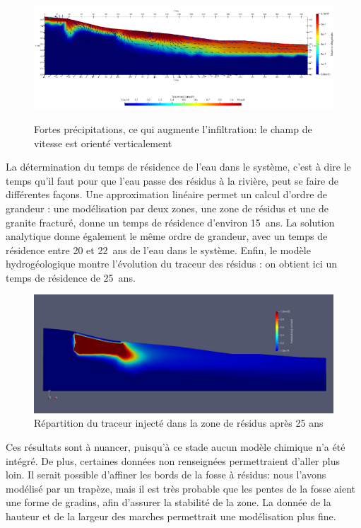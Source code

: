 \documentclass{article}
\begin{document}
\begin{figure}[H]
    \centering
    \includegraphics[width=0.9\linewidth]{III_B_3_7.png}
    \label{fig:v_précipitations_ribiere_2}
    \caption{Fortes précipitations, ce qui augmente l'infiltration: le champ de vitesse est orienté verticalement}
\end{figure}



La détermination du temps de résidence de l'eau dans le système, c'est à dire le temps qu'il faut pour que l'eau passe des résidus à la rivière, peut se faire de différentes façons. Une approximation linéaire permet un calcul d’ordre de grandeur : une modélisation par deux zones, une zone de résidus et une de granite fracturé, donne un temps de résidence d’environ 15~ans. La solution analytique donne également le même ordre de grandeur, avec un temps de résidence entre 20 et 22~ans de l'eau dans le système. Enfin, le modèle hydrogéologique montre l’évolution du traceur des résidus : on obtient ici un temps de résidence de 25~ans.

\begin{figure}[H]
    \centering
    \includegraphics[width=0.9\linewidth]{III_B_3_8.png}
    \caption{Répartition du traceur injecté dans la zone de résidus après 25 ans}
    \label{hytec_hydro_25ans}
\end{figure}

Ces résultats sont à nuancer, puisqu’à ce stade aucun modèle chimique n’a été intégré. De plus, certaines données non renseignées permettraient d’aller plus loin. Il serait possible d’affiner les bords de la fosse à résidus: nous l’avons modélisé par un trapèze, mais il est très probable que les pentes de la fosse aient une forme de gradins, afin d’assurer la stabilité de la zone. La donnée de la hauteur et de la largeur des marches permettrait une modélisation plus fine.
\end{document}
